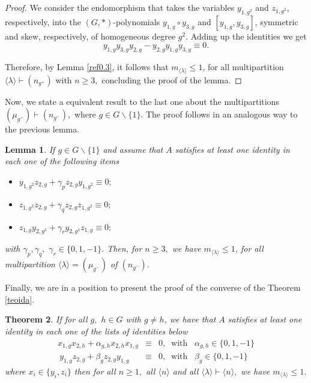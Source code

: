 \documentclass{amsart}
\newtheorem{teorema}{Theorem}[section]
\newtheorem{lema}[teorema]{Lemma}
\numberwithin{equation}{section}
\begin{document}
\begin{proof}
     We consider the endomorphism that takes the variables $y_{1,g^2}$ and $z_{1,g^2}$, respectively, into the $(G,*)$-polynomials $y_{1,g}\circ y_{3,g}$ and $[y_{1,g}, y_{3,g}]$, symmetric and skew, respectively, of homogeneous degree $g^2$. Adding up the identities we get 
$$y_{1,g}y_{3,g}y_{2,g} - y_{2,g}y_{1,g}y_{3,g}\equiv 0.$$

 Therefore, by Lemma \ref{ref0.3}, it follows that $m_{\langle \lambda \rangle}\le 1$, for all multipartition $\langle \lambda \rangle \vdash (n_{g^+})$ with $n\geq 3,$ concluding the proof of the lemma.
    \end{proof}

Now, we state a equivalent result to the last one about the multipartitions $(\mu_{g^-}) \vdash (n_{g^-}),$ where $g\in G\backslash \{1\}.$  The proof follows in an analogous way to the previous lemma.

\begin{lema}\label{lema4F} If $g\in G\backslash \{1\}$ and assume that $A$ satisfies at least one identity in each one of the following items
	\begin{itemize}
		\item[1)]$y_{1,g^2}z_{2,g}+\gamma_{p} z_{2,g}y_{1,g^2}\equiv 0;$
		
		\item[$2$)]$z_{1,g^2}z_{2,g}+\gamma_{q} z_{2,g}z_{1,g^2} \equiv 0;$
		
		\item[$3$)] $z_{1,g}y_{2,g^3}+\gamma_{r} y_{2,g^3}z_{1,g}\equiv 0;$
		
	\end{itemize} 
    with $\gamma_{p}, \gamma_{q},$ $\gamma_{r} \in\{ 0,1,-1\}.$ Then, for $n\geq 3,$ we have $m_{\langle \lambda \rangle}\le 1$, for all multipartition $\langle \lambda \rangle =(\mu_{g^-})$ of $ (n_{g^-}).$
    \end{lema}
    
    Finally, we are in a position to present the proof of the converse of the Theorem \ref{teoida}. 

  \begin{teorema}\label{conj} 
If for all $g,$ $ h \in G$ with $g \neq h$, %
    we have that
	$A$ satisfies
	at least one identity in each one of the lists of identities below 
$$\begin{array}{lcl} x_{1,g}x_{2,h}+\alpha_{g,h}x_{2,h}x_{1,g}&\equiv& 0, \;\; \mbox{with} \;\;\; \alpha_{g,h} \in \{0, 1, -1\}  \\
    ~ y_{1,g}z_{2,g}+\beta_g z_{2,g} y_{1,g}& \equiv&0, \;\;\mbox{with}\;\;\;\beta_g \in \{0, 1, -1\}\end{array}$$
    where $x_i \in \{y_i, z_i\}$ then for all $n \ge 1,$ all $\langle n \rangle$ and all $\langle \lambda \rangle \vdash \langle n \rangle,$ we have $m_{\langle \lambda \rangle} \le 1.$ 
    \end{teorema}
\end{document}
